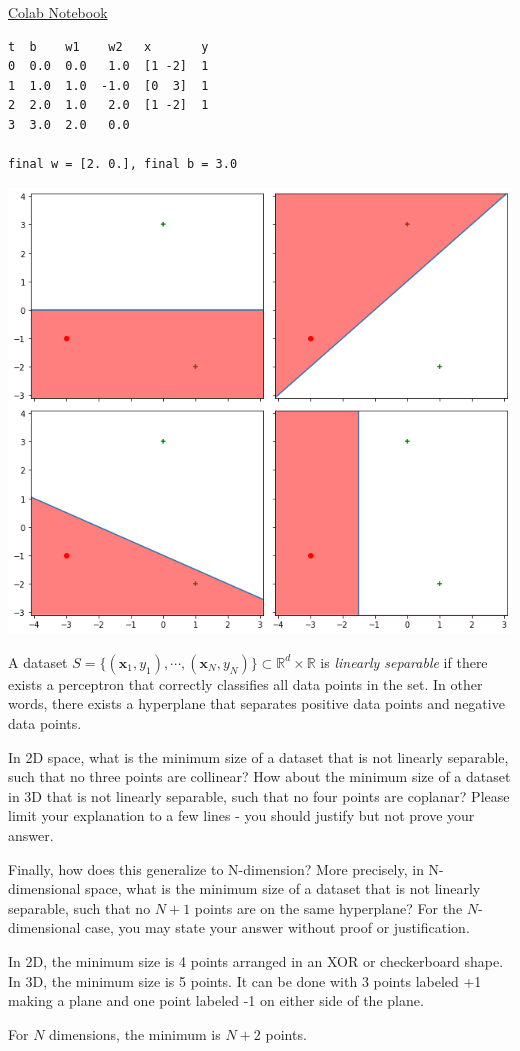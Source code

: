 \begin{solution}
  \href{https://colab.research.google.com/drive/1d8LCVQuZFkL9tPiClGe6zHGv2aIcE8hd?usp=sharing}{Colab Notebook}
  \begin{verbatim}
t  b    w1    w2   x       y
0  0.0  0.0   1.0  [1 -2]  1
1  1.0  1.0  -1.0  [0  3]  1
2  2.0  1.0   2.0  [1 -2]  1
3  3.0  2.0   0.0

final w = [2. 0.], final b = 3.0
  \end{verbatim}

  \includegraphics[width=\textwidth]{images/4a.png}
\end{solution}

\begin{problem}[4]
  A dataset $S = \{(\mathbf{x}_1, y_1),\cdots,(\mathbf{x}_N, y_N)\} \subset \mathbb{R}^d \times \mathbb{R}$ is \emph{linearly separable} if there exists a perceptron that correctly classifies all data points in the set. In other words, there exists a hyperplane that separates positive data points and negative data points.

  In 2D space, what is the minimum size of a dataset that is not linearly separable, such that no three points are collinear? How about the minimum size of a dataset in 3D that is not linearly separable, such that no four points are coplanar? Please limit your explanation to a few lines - you should justify but not prove your answer.

  Finally, how does this generalize to N-dimension? More precisely, in N-dimensional space, what is the minimum size of a dataset that is not linearly separable, such that no $N+1$ points are on the same hyperplane? For the $N$-dimensional case, you may state your answer without proof or justification.
\end{problem}
\begin{solution}
  In 2D, the minimum size is 4 points arranged in an XOR or checkerboard shape.
  In 3D, the minimum size is 5 points. It can be done with 3 points labeled +1 making a plane and one point labeled -1 on either side of the plane.

  For $N$ dimensions, the minimum is $N + 2$ points.
\end{solution}

